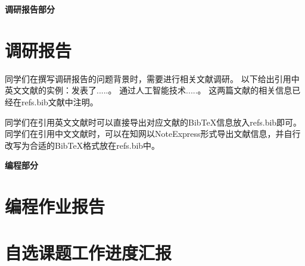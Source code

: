 \documentclass[a4paper]{article}
\begin{document}
\courseheader
{}
\vspace{3mm}
\centerline{\textbf{\Large{调研报告部分}}}
\vspace{3mm}

\section{调研报告}
\hspace{2em}同学们在撰写调研报告的问题背景时，需要进行相关文献调研。
以下给出引用中英文文献的实例：\cite{zhang2022optimising}发表了.....。
\cite{sunyiyao}通过人工智能技术.....。
这两篇文献的相关信息已经在refs.bib文献中注明。

\hspace{2em}同学们在引用英文文献时可以直接导出对应文献的BibTeX信息放入refs.bib即可。
同学们在引用中文文献时，可以在知网以NoteExpress形式导出文献信息，并自行改写为合适的BibTeX格式放在refs.bib中。

\vspace{3mm}
\centerline{\textbf{\Large{编程部分}}}
\vspace{3mm}
\section{编程作业报告}
\section{自选课题工作进度汇报}


\end{document}
